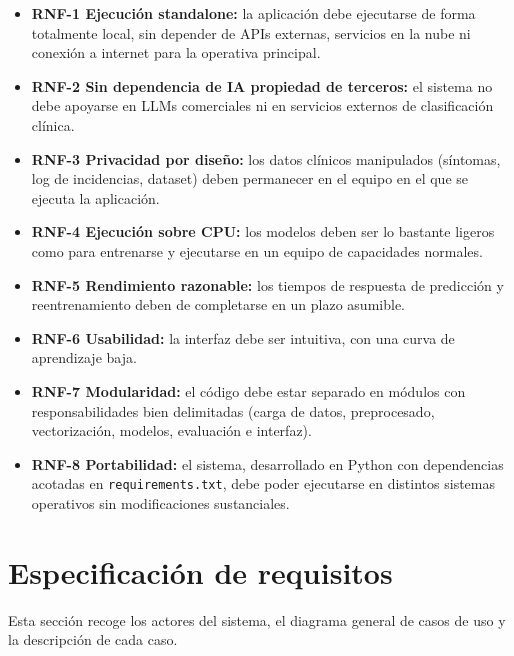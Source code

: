 \begin{itemize}
	\item \textbf{RNF-1 Ejecución \gls{standalone}:} la aplicación debe ejecutarse de forma totalmente local, sin depender de APIs externas, servicios en la nube ni conexión a internet para la operativa principal.
	\item \textbf{RNF-2 Sin dependencia de IA propiedad de terceros:} el sistema no debe apoyarse en LLMs comerciales ni en servicios externos de clasificación clínica.
	\item \textbf{RNF-3 Privacidad por diseño:} los datos clínicos manipulados (síntomas, log de incidencias, dataset) deben permanecer en el equipo en el que se ejecuta la aplicación.
	\item \textbf{RNF-4 Ejecución sobre CPU:} los modelos deben ser lo bastante ligeros como para entrenarse y ejecutarse en un equipo de capacidades normales.
	\item \textbf{RNF-5 Rendimiento razonable:} los tiempos de respuesta de predicción y reentrenamiento deben de completarse en un plazo asumible.
	\item \textbf{RNF-6 Usabilidad:} la interfaz debe ser intuitiva, con una curva de aprendizaje baja.
	\item \textbf{RNF-7 Modularidad:} el código debe estar separado en módulos con responsabilidades bien delimitadas (carga de datos, preprocesado, vectorización, modelos, evaluación e interfaz).
	\item \textbf{RNF-8 Portabilidad:} el sistema, desarrollado en Python con dependencias acotadas en \texttt{requirements.txt}, debe poder ejecutarse en distintos sistemas operativos sin modificaciones sustanciales.
\end{itemize}

\section{Especificación de requisitos}

Esta sección recoge los actores del sistema, el diagrama general de casos de uso y la descripción de cada caso.

